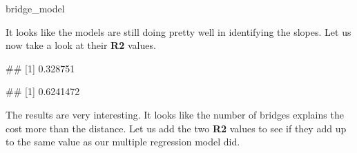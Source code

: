 \documentclass[
]{book}
\newenvironment{Shaded}{\begin{snugshade}}{\end{snugshade}}
\newcommand{\FunctionTok}[1]{\textcolor[rgb]{0.00,0.00,0.00}{#1}}
\newcommand{\NormalTok}[1]{#1}
\newcommand{\SpecialCharTok}[1]{\textcolor[rgb]{0.00,0.00,0.00}{#1}}
\begin{document}
\begin{Shaded}
\begin{Highlighting}[]
\NormalTok{bridge\_model}
\end{Highlighting}
\end{Shaded}

\begin{Shaded}
\end{Shaded}

It looks like the models are still doing pretty well in identifying the slopes. Let us now take a look at their \textbf{R2} values.

\begin{Shaded}
\end{Shaded}

\begin{Shaded}
\begin{Highlighting}[]
\NormalTok{\#\# [1] 0.328751}
\end{Highlighting}
\end{Shaded}

\begin{Shaded}
\end{Shaded}

\begin{Shaded}
\begin{Highlighting}[]
\NormalTok{\#\# [1] 0.6241472}
\end{Highlighting}
\end{Shaded}

The results are very interesting. It looks like the number of bridges explains the cost more than the distance. Let us add the two \textbf{R2} values to see if they add up to the same value as our multiple regression model did.
\end{document}
